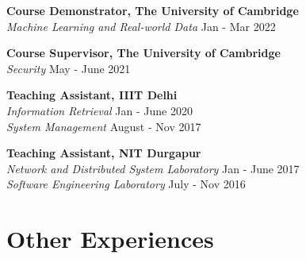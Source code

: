 \documentclass[margin, centered]{res}
\begin{document}
\begin{resume}
\textbf{Course Demonstrator, The University of Cambridge} \\
\emph{Machine Learning and Real-world Data} \hfill Jan - Mar 2022

\textbf{Course Supervisor, The University of Cambridge} \\
\emph{Security} \hfill May - June 2021

\textbf{Teaching Assistant, IIIT Delhi} \\
\emph{Information Retrieval} \hfill Jan - June 2020 \\
\emph{System Management} \hfill August - Nov 2017


\textbf{Teaching Assistant, NIT Durgapur} \\
\emph{Network and Distributed System Laboratory} \hfill Jan - June 2017 \\
\emph{Software Engineering Laboratory} \hfill July - Nov 2016

\section{Other Experiences}


\end{resume}
\end{document}
